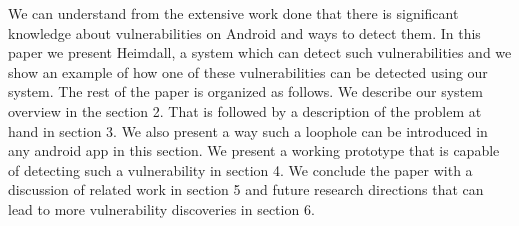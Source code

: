 We can understand from the extensive work done that there is significant knowledge about vulnerabilities on Android and ways to detect them. In this paper we present Heimdall, a system which can detect such vulnerabilities and we show an example of how one of these vulnerabilities can be detected using our system. The rest of the paper is organized as follows. We describe our system overview in the section 2. That is followed by a description of the problem at hand in section 3. We also present a way such a loophole can be introduced in any android app in this section. We present a working prototype that is capable of detecting such a vulnerability in section 4. We conclude the paper with a discussion of related work in section 5 and future research directions that can lead to more vulnerability discoveries in section 6.


